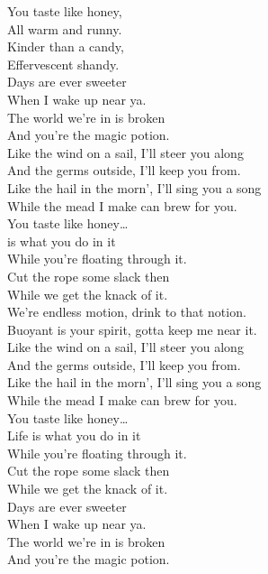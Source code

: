 



You taste like honey, \\
All warm and runny. \\
Kinder than a candy, \\
Effervescent shandy. \\
Days are ever sweeter \\
When I wake up near ya. \\
The world we're in is broken \\
And you're the magic potion. \\

Like the wind on a sail, I'll steer you along \\
And the germs outside, I'll keep you from. \\
Like the hail in the morn', I'll sing you a song \\
While the mead I make can brew for you. \\

You taste like honey… \\

 is what you do in it \\
While you're floating through it. \\
Cut the rope some slack then \\
While we get the knack of it. \\
We're endless motion, drink to that notion. \\
Buoyant is your spirit, gotta keep me near it. \\

Like the wind on a sail, I'll steer you along \\
And the germs outside, I'll keep you from. \\
Like the hail in the morn', I'll sing you a song \\
While the mead I make can brew for you. \\

You taste like honey… \\

Life is what you do in it \\
While you're floating through it. \\
Cut the rope some slack then \\
While we get the knack of it. \\
Days are ever sweeter \\
When I wake up near ya. \\
The world we're in is broken \\
And you're the magic potion. \\

